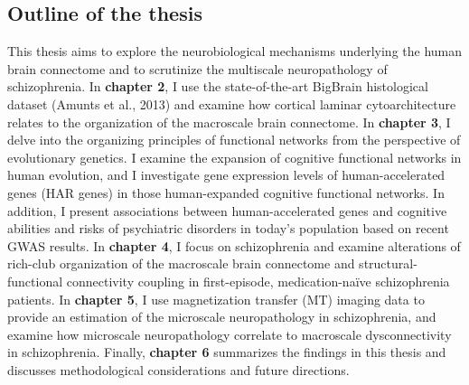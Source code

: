 \begin{refsection}
\section*{Outline of the thesis}
This thesis aims to explore the neurobiological mechanisms underlying the human brain connectome and to scrutinize the multiscale neuropathology of schizophrenia. In \textbf{chapter 2}, I use the state-of-the-art BigBrain histological dataset (Amunts et al., 2013) and examine how cortical laminar cytoarchitecture relates to the organization of the macroscale brain connectome. In \textbf{chapter 3}, I delve into the organizing principles of functional networks from the perspective of evolutionary genetics. I examine the expansion of cognitive functional networks in human evolution, and I investigate gene expression levels of human-accelerated genes (HAR genes) in those human-expanded cognitive functional networks. In addition, I present associations between human-accelerated genes and cognitive abilities and risks of psychiatric disorders in today’s population based on recent GWAS results. In \textbf{chapter 4}, I focus on schizophrenia and examine alterations of rich-club organization of the macroscale brain connectome and structural-functional connectivity coupling in first-episode, medication-naïve schizophrenia patients. In \textbf{chapter 5}, I use magnetization transfer (MT) imaging data to provide an estimation of the microscale neuropathology in schizophrenia, and examine how microscale neuropathology correlate to macroscale dysconnectivity in schizophrenia. Finally, \textbf{chapter 6} summarizes the findings in this thesis and discusses methodological considerations and future directions.

\end{refsection}